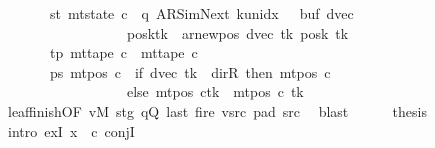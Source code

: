 \begin{isabellebody}
\ \ \ \ \ \ \ st{\isacharcolon}{\kern0pt}\ {\isachardoublequoteopen}mt{\isacharunderscore}{\kern0pt}state\ c{\isacharprime}{\kern0pt}\ {\isacharequal}{\kern0pt}\ {\isacharparenleft}{\kern0pt}q{\isacharcomma}{\kern0pt}\ AR{\isacharunderscore}{\kern0pt}SimNext{\isacharcomma}{\kern0pt}\ k{\isacharunderscore}{\kern0pt}unidx\ {}{\isacharcomma}{\kern0pt}\ {}{\isacharcomma}{\kern0pt}\ buf{\isacharcomma}{\kern0pt}\ dvec{\isacharcomma}{\kern0pt}\isanewline
\ \ \ \ \ \ \ \ \ \ \ \ \ \ \ \ \ \ posk{\isacharparenleft}{\kern0pt}tk\ {\isacharcolon}{\kern0pt}{\isacharequal}{\kern0pt}\ ar{\isacharunderscore}{\kern0pt}newpos\ {\isacharparenleft}{\kern0pt}dvec\ tk{\isacharparenright}{\kern0pt}\ {\isacharparenleft}{\kern0pt}posk\ tk{\isacharparenright}{\kern0pt}{\isacharparenright}{\kern0pt}{\isacharparenright}{\kern0pt}{\isachardoublequoteclose}\isanewline
\ \ \ \ \ \ \ tp{\isacharcolon}{\kern0pt}\ {\isachardoublequoteopen}mt{\isacharunderscore}{\kern0pt}tape\ c{\isacharprime}{\kern0pt}\ {\isacharequal}{\kern0pt}\ mt{\isacharunderscore}{\kern0pt}tape\ c{}{\isachardoublequoteclose}\isanewline
\ \ \ \ \ \ \ ps{\isacharcolon}{\kern0pt}\ {\isachardoublequoteopen}mt{\isacharunderscore}{\kern0pt}pos\ c{\isacharprime}{\kern0pt}\ {\isacharequal}{\kern0pt}\ {\isacharparenleft}{\kern0pt}if\ dvec\ tk\ {\isacharequal}{\kern0pt}\ dir{\isachardot}{\kern0pt}R\ then\ mt{\isacharunderscore}{\kern0pt}pos\ c{}\isanewline
\ \ \ \ \ \ \ \ \ \ \ \ \ \ \ \ \ \ else\ {\isacharparenleft}{\kern0pt}mt{\isacharunderscore}{\kern0pt}pos\ c{}{\isacharparenright}{\kern0pt}{\isacharparenleft}{\kern0pt}tk\ {\isacharcolon}{\kern0pt}{\isacharequal}{\kern0pt}\ mt{\isacharunderscore}{\kern0pt}pos\ c{}\ tk\ {\isacharminus}{\kern0pt}\ {}{\isacharparenright}{\kern0pt}{\isacharparenright}{\kern0pt}{\isachardoublequoteclose}\isanewline
\ \ \ \ \ \ \isamarkupfalse%
\ leaf{\isacharunderscore}{\kern0pt}finish{\isacharbrackleft}{\kern0pt}OF\ vM\ stg\ qQ\ last\ fire\ vsrc{}\ pad{}\ src{}{\isacharbrackright}{\kern0pt}\ \isamarkupfalse%
\ blast\isanewline
\ \ \ \ \isamarkupfalse%
\ {\isacharquery}{\kern0pt}thesis\isanewline
\ \ \ \ \isamarkupfalse%
\ {\isacharparenleft}{\kern0pt}intro\ exI{\isacharbrackleft}{\kern0pt}\ x\ {\isacharequal}{\kern0pt}\ c{\isacharprime}{\kern0pt}{\isacharbrackright}{\kern0pt}\ conjI{\isacharparenright}{\kern0pt}\isanewline

\end{isabellebody}
